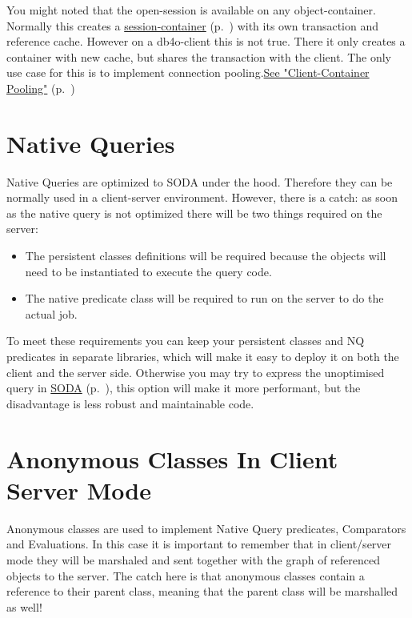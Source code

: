 You might noted that the open-session is available on any object-container. Normally this creates a \hyperref[ref:advanced-topics-session-containers]{session-container} (p.~\pageref{ref:advanced-topics-session-containers}) with its own transaction and reference cache. However on a db4o-client this is not true. There it only creates a container with new cache, but shares the transaction with the client. The only use case for this is to implement connection pooling.\hyperref[ref:client-server-pooling]{See "Client-Container Pooling"} (p.~\pageref{ref:client-server-pooling})

\section{Native Queries}
\label{ref:client-server-native-queries}

Native Queries are optimized to SODA under the hood. Therefore they can be normally used in a client-server environment. However, there is a catch: as soon as the native query is not optimized there will be two things required on the server:

\begin{itemize}
\item The persistent classes definitions will be required because the objects will need to be instantiated to execute the query code.
\item The native predicate class will be required to run on the server to do the actual job.
\end{itemize}

To meet these requirements you can keep your persistent classes and NQ predicates in separate libraries, which will make it easy to deploy it on both the client and the server side. Otherwise you may try to express the unoptimised query in \hyperref[ref:basics-querying-soda-query]{SODA} (p.~\pageref{ref:basics-querying-soda-query}), this option will make it more performant, but the disadvantage is less robust and maintainable code.

\section{Anonymous Classes In Client Server Mode}
\label{ref:client-server-anonymous-classes}

Anonymous classes are used to implement Native Query predicates, Comparators and Evaluations. In this case it is important to remember that in client/server mode they will be marshaled and sent together with the graph of referenced objects to the server. The catch here is that anonymous classes contain a reference to their parent class, meaning that the parent class will be marshalled as well!

